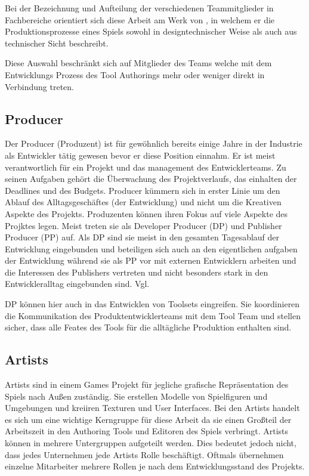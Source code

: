 \documentclass[pagesize, paper=a4, fontsize=12pt,titlepage=true, headings=small, headnosepline, abstractoff, liststotoc, nochapterprefix, plainheadsepline, twoside]{scrreprt}
\begin{document}
Bei der Bezeichnung und Aufteilung der verschiedenen Teammitglieder in Fachbereiche orientiert sich diese Arbeit am Werk von , in welchem er die Produktionsprozesse eines Spiels sowohl in designtechnischer Weise als auch aus technischer Sicht beschreibt.

Diese Auswahl beschränkt sich auf Mitglieder des Teams welche mit dem Entwicklungs Prozess des Tool Authorings mehr oder weniger direkt in Verbindung treten.

\subsection{Producer}
Der Producer (Produzent) ist für gewöhnlich bereits einige Jahre in der Industrie als Entwickler tätig gewesen bevor er diese Position einnahm. Er ist meist verantwortlich für ein Projekt und das management des Entwicklerteams. Zu seinen Aufgaben gehört die Überwachung des Projektverlaufs, das einhalten der Deadlines und des Budgets. Producer kümmern sich in erster Linie um den Ablauf des Alltagsgeschäftes (der Entwicklung) und nicht um die Kreativen Aspekte des Projekts. Produzenten können ihren Fokus auf viele Aspekte des Projktes legen. Meist treten sie als Developer Producer (DP) und Publisher Producer (PP) auf. Als DP sind sie meist in den gesamten Tagesablauf der Entwicklung eingebunden und beteiligen sich auch an den eigentlichen aufgaben der Entwicklung während sie als PP vor mit externen Entwicklern arbeiten und die Interessen des Publishers vertreten und nicht besonders stark in den Entwickleralltag eingebunden sind. Vgl. 

DP können hier auch in das Entwicklen von Toolsets eingreifen. Sie koordinieren die Kommunikation des Produktentwicklerteams mit dem Tool Team und stellen sicher, dass alle Feates des Tools für die alltägliche Produktion enthalten sind.

\subsection{Artists}
Artists sind in einem Games Projekt für jegliche grafische Repräsentation des Spiels nach Außen zuständig. Sie erstellen Modelle von Spielfiguren und Umgebungen und kreiiren Texturen und User Interfaces. Bei den Artists handelt es sich um eine wichtige Kerngruppe für diese Arbeit da sie einen Großteil der Arbeitszeit in den Authoring Tools und Editoren des Spiels verbringt. Artists können in mehrere Untergruppen aufgeteilt werden. Dies bedeutet jedoch nicht, dass jedes Unternehmen jede Artists Rolle beschäftigt. Oftmals übernehmen einzelne Mitarbeiter mehrere Rollen je nach dem Entwicklungsstand des Projekts.
\end{document}
